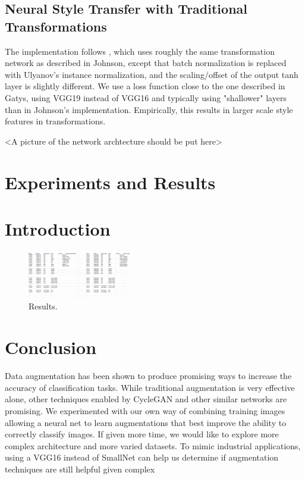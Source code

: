 \documentclass[a4paper,11pt]{article}
\begin{document}
\subsection{Neural Style Transfer with Traditional Transformations}
The implementation follows \cite{engstrom2016faststyletransfer}, which uses roughly the same transformation network as described in Johnson, except that batch normalization is replaced with Ulyanov's instance normalization, and the scaling/offset of the output tanh layer is slightly different. We use a loss function close to the one described in Gatys, using VGG19 instead of VGG16 and typically using "shallower" layers than in Johnson's implementation. Empirically, this results in larger scale style features in transformations. 

<A picture of the network archtecture  should be put here>

\section{Experiments and Results}
\section{Introduction}
\begin{figure}
  \vspace{-20pt}
  \begin{center}
    \includegraphics[width=0.4\textwidth, height=0.28\textwidth]{results.png}
\end{center}
\vspace{-20pt}
  \caption{Results.}
  \vspace{-0pt}
\end{figure}

\section{Conclusion}
Data augmentation has been shown to produce promising ways to increase the accuracy of classiﬁcation tasks. While traditional augmentation is very effective alone, other techniques enabled by CycleGAN and other similar networks are promising. We experimented with our own way of combining training images allowing a neural net to learn augmentations that best improve the ability to correctly classify images. If given more time, we would like to explore more complex architecture and more varied datasets. To mimic industrial applications, using a VGG16 instead of SmallNet can help us determine if augmentation techniques are still helpful given complex
\end{document}
